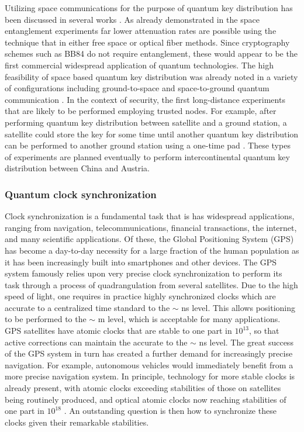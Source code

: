 \documentclass[aps,rmp,reprint,amsmath,amssymb,graphicx,longbibliography]{revtex4-1}
\begin{document}
Utilizing space communications for the purpose of quantum key distribution has been discussed in several works \cite{hughes2000quantum,rarity2002ground,pfennigbauer2003free,aspelmeyer2003long,armengol08}. As already demonstrated in the space entanglement  experiments \cite{yin2017satellite,ren2017ground,liao2017satellite} far lower attenuation rates are possible using the technique that in either free space or optical fiber methods.  Since cryptography schemes such as BB84 do not require entanglement, these would appear to be the first commercial widespread application of quantum technologies.  The high feasibility of space based quantum key distribution was already noted in a variety of configurations including ground-to-space and space-to-ground quantum communication \cite{rarity2002ground,aspelmeyer2003long}.  In the context of security, the first long-distance experiments that are likely to be performed employing trusted nodes.  For example, after performing quantum key distribution between satellite and a ground station, a satellite could store the key for some time until another quantum key distribution can be performed to another ground station using a one-time pad \cite{liao2017satellite}.  These types of experiments are planned eventually to perform intercontinental quantum key distribution between China and Austria.  









\subsubsection{Quantum clock synchronization}


Clock synchronization is a fundamental task that is has widespread applications, ranging from navigation, telecommunications, financial transactions, the internet, and many scientific applications. Of these, the Global Positioning System (GPS) has become a day-to-day necessity for a large fraction of the human population as it has been increasingly built into smartphones and other devices. The GPS system famously relies upon very precise clock synchronization to perform its task through a process of quadrangulation from several satellites. Due to the high speed of light, one requires in practice highly synchronized clocks which are accurate to a centralized time standard to the $\sim$ ns level. This allows positioning to be performed to the $\sim$ m level, which is acceptable for many applications. GPS satellites have atomic clocks that are stable to one part in $10^{13}$, so that active corrections can maintain the accurate to the $\sim$ ns level. The great success of the GPS system in turn has created a further demand for increasingly precise navigation. For example, autonomous vehicles would immediately benefit from a more precise navigation system. In principle, technology for more stable clocks is already present, with atomic clocks exceeding stabilities of those on satellites being routinely produced, and optical atomic clocks now reaching stabilities of one part in $10^{18}$  \cite{ludlow2015optical}. An outstanding question is then how to synchronize these clocks given their remarkable stabilities. 
\end{document}
